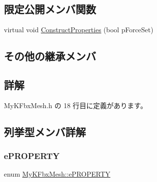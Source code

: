 \subsection*{限定公開メンバ関数}
\begin{DoxyCompactItemize}
\item 
virtual void \hyperlink{class_my_k_fbx_mesh_a9fc01e7c17e2e1456cf7859f05d253e8}{Construct\+Properties} (bool p\+Force\+Set)
\end{DoxyCompactItemize}
\subsection*{その他の継承メンバ}


\subsection{詳解}


 My\+K\+Fbx\+Mesh.\+h の 18 行目に定義があります。



\subsection{列挙型メンバ詳解}
\mbox{\label{class_my_k_fbx_mesh_a8344a454859b89ec1d69eed93edfe76e}} 
\subsubsection{\texorpdfstring{e\+P\+R\+O\+P\+E\+R\+TY}{ePROPERTY}}
{\footnotesize\ttfamily enum \hyperlink{class_my_k_fbx_mesh_a8344a454859b89ec1d69eed93edfe76e}{My\+K\+Fbx\+Mesh\+::e\+P\+R\+O\+P\+E\+R\+TY}}

